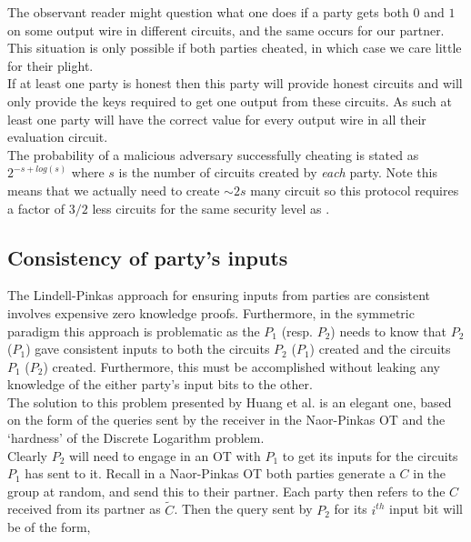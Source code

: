 \documentclass[ %
                    author={Nicholas Tutte},
                supervisor={Prof. Nigel Smart},
                    degree={MEng},
                     title={Secure Two Party Computation},
                  subtitle={A practical comparison of recent protocols},
                      type={Research - GG1K},
                      year={2015} ]{dissertation}
\begin{document}
				The observant reader might question what one does if a party gets both $0$ and $1$ on some output wire in different circuits, and the same occurs for our partner. This situation is only possible if both parties cheated, in which case we care little for their plight.\\

				If at least one party is honest then this party will provide honest circuits and will only provide the keys required to get one output from these circuits. As such at least one party will have the correct value for every output wire in all their evaluation circuit.\\

				The probability of a malicious adversary successfully cheating is stated as $2^{-s + log(s)}$ where $s$ is the number of circuits created by \emph{each} party. Note this means that we actually need to create $\sim 2s$ many circuit so this protocol requires a factor of $3/2$ less circuits for the same security level as \cite{LindellAndPinkas2011}.\\
				
			\subsection{Consistency of party's inputs} \label{sub:HKE_Consistency}
				The Lindell-Pinkas approach for ensuring inputs from parties are consistent involves expensive zero knowledge proofs. Furthermore, in the symmetric paradigm this approach is problematic as the $P_1$ (resp. $P_2$) needs to know that $P_2$ ($P_1$) gave consistent inputs to both the circuits $P_2$ ($P_1$) created and the circuits $P_1$ ($P_2$) created. Furthermore, this must be accomplished without leaking any knowledge of the either party's input bits to the other.\\

				The solution to this problem presented by Huang et al. is an elegant one, based on the form of the queries sent by the receiver in the Naor-Pinkas OT and the `hardness' of the Discrete Logarithm problem.\\

				Clearly $P_2$ will need to engage in an OT with $P_1$ to get its inputs for the circuits $P_1$ has sent to it. Recall in a Naor-Pinkas OT both parties generate a $C$ in the group at random, and send this to their partner. Each party then refers to the $C$ received from its partner as $\tilde C$. Then the query sent by $P_2$ for its $i^{th}$ input bit will be of the form,
\end{document}
